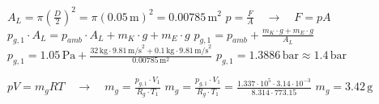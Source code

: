 \( A_L = \pi \left( \frac{D}{2} \right)^2 = \pi \left( 0.05 \, \text{m} \right)^2 = 0.00785 \, \text{m}^2 \)  
\( p = \frac{F}{A} \quad \rightarrow \quad F = pA \)  
\( p_{g,1} \cdot A_L = p_{amb} \cdot A_L + m_K \cdot g + m_E \cdot g \)  
\( p_{g,1} = p_{amb} + \frac{m_K \cdot g + m_E \cdot g}{A_L} \)  
\( p_{g,1} = 1.05 \, \text{Pa} + \frac{32 \, \text{kg} \cdot 9.81 \, \text{m/s}^2 + 0.1 \, \text{kg} \cdot 9.81 \, \text{m/s}^2}{0.00785 \, \text{m}^2} \)  
\( p_{g,1} = 1.3886 \, \text{bar} \approx 1.4 \, \text{bar} \)  

\( pV = m_gRT \quad \rightarrow \quad m_g = \frac{p_{g,1} \cdot V_1}{R_g \cdot T_1} \)  
\( m_g = \frac{p_{g,1} \cdot V_1}{R_g \cdot T_1} = \frac{1.337 \cdot 10^5 \cdot 3.14 \cdot 10^{-3}}{8.314 \cdot 773.15} \)  
\( m_g = 3.42 \, \text{g} \)